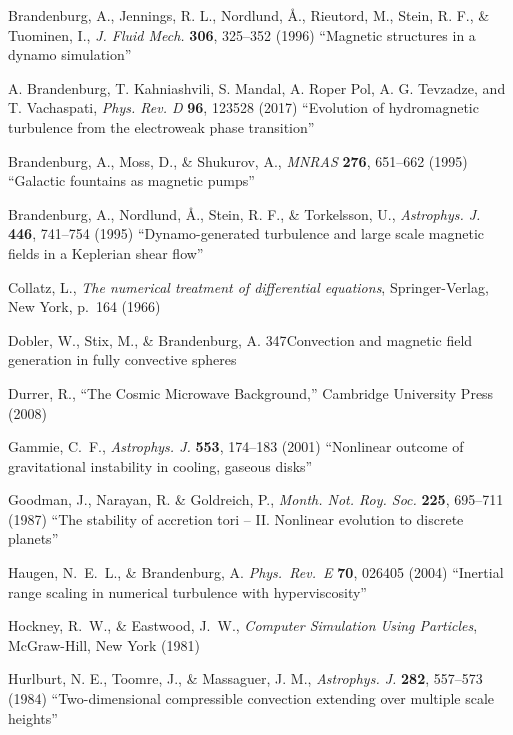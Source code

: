 \documentclass[\mydriver,12pt,twoside,notitlepage,a4paper]{article}
\begin{document}
\begin{thebibliography}{99}
 Brandenburg, A., Jennings, R. L., Nordlund, \AA.,
  Rieutord, M., Stein, R. F., \& Tuominen, I.,
  \emph{J. Fluid Mech.} \textbf{306}, 325--352 (1996)
  ``Magnetic structures in a dynamo simulation''

A. Brandenburg, T. Kahniashvili, S. Mandal, A. Roper Pol, A. G. Tevzadze, and T. Vachaspati, 
  \emph{Phys. Rev. D} \textbf{96}, 123528 (2017)
  ``Evolution of hydromagnetic turbulence from the electroweak phase transition''

Brandenburg, A., Moss, D., \& Shukurov, A.,
  \emph{MNRAS} \textbf{276}, 651--662 (1995)
  ``Galactic fountains as magnetic pumps''

 Brandenburg, A., Nordlund, \AA., Stein, R. F.,
  \& Torkelsson, U.,
  \emph{Astrophys. J.} \textbf{446}, 741--754 (1995)
  ``Dynamo-generated turbulence and large scale magnetic fields
  in a Keplerian shear flow''

Collatz, L.,
  \emph{The numerical treatment of differential equations},
  Springer-Verlag, New York, p.\ 164 (1966)

  Dobler, W., Stix, M., \& Brandenburg, A.
  {347}{Convection and magnetic field generation in fully convective spheres}

Durrer, R., ``The Cosmic Microwave Background,''
Cambridge University Press (2008)

Gammie, C.~F.,
  \emph{Astrophys. J.} \textbf{553}, 174--183 (2001)
  ``Nonlinear outcome of gravitational instability in cooling, gaseous disks''

Goodman, J., Narayan, R. \& Goldreich, P.,
  \emph{Month. Not. Roy. Soc.} \textbf{225}, 695--711 (1987)
  ``The stability of accretion tori -- II. Nonlinear evolution
  to discrete planets''

Haugen, N.~E.~L., \& Brandenburg, A.
  \emph{Phys.~Rev.~E} \textbf{70}, 026405 (2004)
  ``Inertial range scaling in numerical turbulence with hyperviscosity''

Hockney, R.~W., \& Eastwood, J.~W.,
  \emph{Computer Simulation Using Particles},
  McGraw-Hill, New York (1981)

Hurlburt, N. E., Toomre, J., \& Massaguer, J. M.,
  \emph{Astrophys. J.} \textbf{282}, 557--573 (1984)
  ``Two-dimensional compressible convection extending over multiple scale
  heights''


\end{thebibliography}
\end{document}
